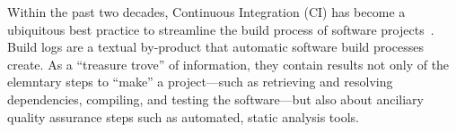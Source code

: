 





Within the past two decades, Continuous Integration (CI) has become a
ubiquitous best practice to streamline the build process of software
projects~\cite{hilton2016usage,beller2017oops,staahl2014modeling}.
Build
logs are a textual by-product that automatic software build processes
create.
As a ``treasure trove'' of information, they contain results
not only of the elemntary steps to ``make'' a project---such as
retrieving and resolving dependencies, compiling, and testing the
software---but also about anciliary quality assurance steps such as
automated, static analysis tools.

